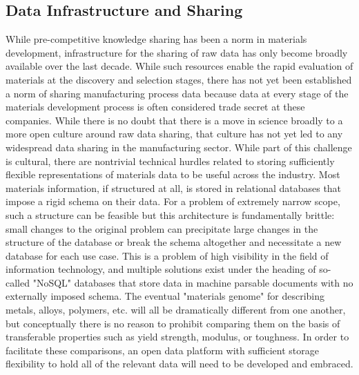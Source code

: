 

\subsection{Data Infrastructure and Sharing}
While pre-competitive knowledge sharing has been a norm in materials development, infrastructure for the sharing of raw data has only become broadly available over the last decade\cite{CitrineInformatics,MP}. While such resources enable the rapid evaluation of materials at the discovery and selection stages, there has not yet been established a norm of sharing manufacturing process data because data at every stage of the materials development process is often considered trade secret at these companies\cite{TheMinerals2013}. While there is no doubt that there is a move in science broadly to a more open culture around raw data sharing, that culture has not yet led to any widespread data sharing in the manufacturing sector.
While part of this challenge is cultural, there are nontrivial technical hurdles related to storing sufficiently flexible representations of materials data to be useful across the industry. 
Most materials information, if structured at all, is stored in relational databases that impose a rigid schema on their data. 
For a problem of extremely narrow scope, such a structure can be feasible but this architecture is fundamentally brittle: small changes to the original problem can precipitate large changes in the structure of the database or break the schema altogether and necessitate a new database for each use case.
This is a problem of high visibility in the field of information technology, and multiple solutions exist under the heading of so-called "NoSQL" databases that store data in machine parsable documents with no externally imposed schema\cite{Han2011,Kaur2013}.
The eventual "materials genome" for describing metals, alloys, polymers, etc. will all be dramatically different from one another, but conceptually there is no reason to prohibit comparing them on the basis of transferable properties such as yield strength, modulus, or toughness. 
In order to facilitate these comparisons, an open data platform with sufficient storage flexibility to hold all of the relevant data will need to be developed and embraced.

